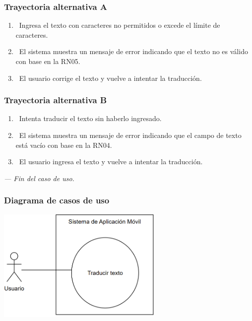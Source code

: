 \subsubsection{Trayectoria alternativa A}
\begin{enumerate}[label=\textbf{\arabic*}, leftmargin=1.5cm]
    \item \UCactor \ Ingresa el texto con caracteres no permitidos o excede el límite de caracteres.
	\item \UCsystem \ El sistema muestra un mensaje de error indicando que el texto no es válido con base en la RN05.  
	\item \UCactor \ El usuario corrige el texto y vuelve a intentar la traducción.
\end{enumerate}

\subsubsection{Trayectoria alternativa B}
\begin{enumerate}[label=\textbf{\arabic*}, leftmargin=1.5cm]
    \item \UCactor \ Intenta traducir el texto sin haberlo ingresado.
	\item \UCsystem \ El sistema muestra un mensaje de error indicando que el campo de texto está vacío con base en la RN04.
	\item \UCactor \ El usuario ingresa el texto y vuelve a intentar la traducción.
\end{enumerate}

\textit{--- Fin del caso de uso.}


\subsubsection{Diagrama de casos de uso}
\begin{center}
    \includegraphics[width=0.6\textwidth]{Images/Cap 3/casodeuso.png}
\end{center}

